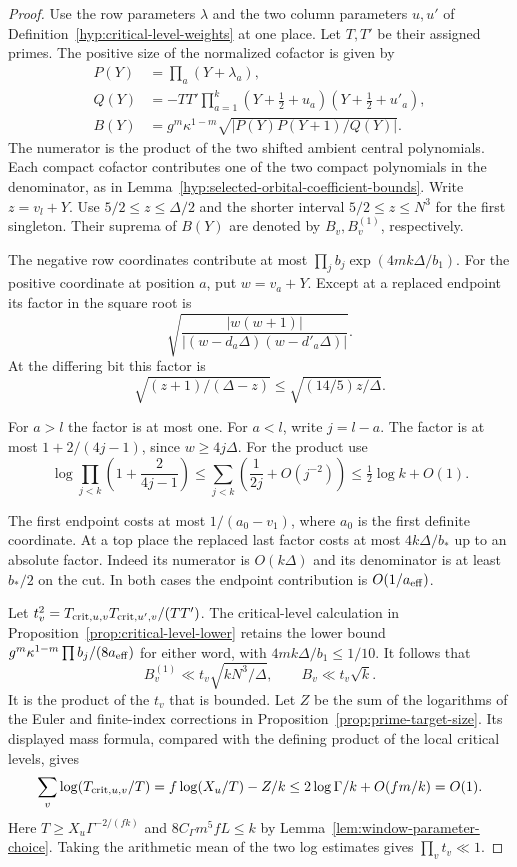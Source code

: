 \begin{proof}
Use the row parameters \(\lambda\) and the two column parameters
\(u,u'\) of Definition~\ref{hyp:critical-level-weights} at one place.
Let \(T,T'\) be their assigned primes. The positive size of the
normalized cofactor is given by
\[
 \begin{aligned}
 P(Y)&=\prod_a(Y+\lambda_a),\\
 Q(Y)&=-TT'\prod_{a=1}^k
                   (Y+\tfrac12+u_a)(Y+\tfrac12+u'_a),\\
 B(Y)&=g^m\kappa^{1-m}\sqrt{|P(Y)P(Y+1)/Q(Y)|}.
 \end{aligned}
\]
The numerator is the product of the two shifted ambient central
polynomials. Each compact cofactor contributes one of the two compact
polynomials in the denominator, as in
Lemma~\ref{hyp:selected-orbital-coefficient-bounds}. Write \(z=v_l+Y\).
Use \(5/2\le z\le\Delta/2\) and the shorter interval
\(5/2\le z\le N^3\) for the first singleton. Their suprema of \(B(Y)\)
are denoted by \(B_v,B_v^{(1)}\), respectively.

The negative row coordinates contribute at most
\(\prod_j b_j\exp(4mk\Delta/b_1)\).
For the positive coordinate at position \(a\), put \(w=v_a+Y\).
Except at a replaced endpoint its factor in the square root is
\[
 \sqrt{\frac{|w(w+1)|}
 {|(w-d_a\Delta)(w-d'_a\Delta)|}}.
\]
At the differing bit this factor is
\[
    \sqrt{(z+1)/(\Delta-z)}\le\sqrt{(14/5)z/\Delta}.
\]


For \(a>l\) the factor is at most one. For \(a<l\), write
\(j=l-a\). The factor is at most
\(1+2/(4j-1)\), since \(w\ge4j\Delta\).
For the product use
\[
 \log\prod_{j<k}\left(1+\frac{2}{4j-1}\right)
 \le \sum_{j<k}\left(\frac1{2j}+O(j^{-2})\right)
       \le \tfrac12\log k+O(1).
\]


The first endpoint costs at most \(1/(a_0-v_1)\), where \(a_0\)
is the first definite coordinate. At a top place the replaced
last factor costs at most \(4k\Delta/b_*\) up to an absolute
factor. Indeed its numerator is \(O(k\Delta)\) and its denominator
is at least \(b_*/2\) on the cut. In both cases the endpoint
contribution is \(O(1/a_{\rm eff})\).

Let \(t_v^2=T_{{\rm crit},u,v}T_{{\rm crit},u',v}/(TT')\).
The critical-level calculation in Proposition~\ref{prop:critical-level-lower}
retains the lower bound \(g^m\kappa^{1-m}\prod b_j/(8a_{\rm eff})\)
for either word, with \(4mk\Delta/b_1\le1/10\). It follows that
\[
 B_v^{(1)}\ll t_v\sqrt{k N^3/\Delta},\qquad B_v\ll t_v\sqrt k .
\]
It is the product of the \(t_v\) that is bounded. Let \(Z\) be the
sum of the logarithms of the Euler and finite-index corrections in
Proposition~\ref{prop:prime-target-size}. Its displayed mass formula,
compared with the defining product of the local critical levels, gives
\[
 \sum_v\log(T_{{\rm crit},u,v}/T)
 =f\log(X_u/T)-Z/k
 \le 2\log\Gamma/k+O(fm/k)=O(1).
\]
Here \(T\ge X_u\Gamma^{-2/(fk)}\) and
\(8 C_\Gamma m^5 f L\le k\) by Lemma~\ref{lem:window-parameter-choice}.
Taking the arithmetic mean of the two log estimates gives
\(\prod_v t_v\ll1\).


\end{proof}
